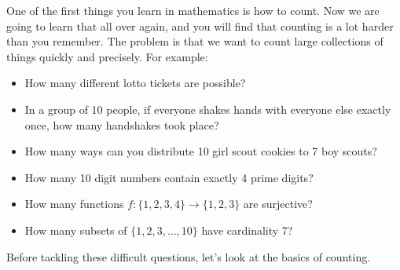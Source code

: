 \documentclass[12pt]{article}
\begin{document}
One of the first things you learn in mathematics is how to count.  Now we are going to learn that all over again, and you will find that counting is a lot harder than you remember.  The problem is that we want to count large collections of things quickly and precisely.  For example:
\begin{itemize}
 \item How many different lotto tickets are possible?
 \item In a group of 10 people, if everyone shakes hands with everyone else exactly once, how many handshakes took place? %
 \item How many ways can you distribute 10 girl scout cookies to 7 boy scouts?
 \item How many 10 digit numbers contain exactly 4 prime digits?
 \item How many functions $f: \{1,2,3,4\} \to \{1,2,3\}$ are surjective?  
 \item How many subsets of $\{1,2,3,\ldots, 10\}$ have cardinality 7?
\end{itemize}

Before tackling these difficult questions, let's look at the basics of counting.
\end{document}
